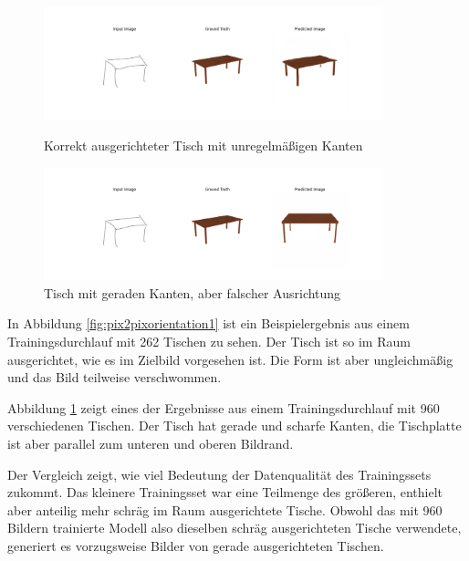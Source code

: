 \begin{figure}[h]
	\centering
	\includegraphics[width=0.875\textwidth]{bilder/pix2pix_progress/table_result_orientation1.png}
  \caption[Tisch korrekt ausgerichtet]{Korrekt ausgerichteter Tisch mit unregelmäßigen Kanten}
  \label{fig:pix2pixorientation1}

	\includegraphics[width=0.875\textwidth]{bilder/pix2pix_progress/table_result_orientation2.png}
	\caption[Tisch mit geraden Kanten]{Tisch mit geraden Kanten, aber falscher Ausrichtung}
	\label{fig:pix2pixorientation2}
\end{figure}

In Abbildung \ref{fig:pix2pixorientation1} ist ein Beispielergebnis aus einem Trainingsdurchlauf mit 262 Tischen zu sehen. Der Tisch ist so im Raum ausgerichtet, wie es im Zielbild vorgesehen ist. Die Form ist aber ungleichmäßig und das Bild teilweise verschwommen.

Abbildung \ref{fig:pix2pixorientation2} zeigt eines der Ergebnisse aus einem Trainingsdurchlauf mit 960 verschiedenen Tischen. Der Tisch hat gerade und scharfe Kanten, die Tischplatte ist aber parallel zum unteren und oberen Bildrand.

Der Vergleich zeigt, wie viel Bedeutung der Datenqualität des Trainingssets zukommt. Das kleinere Trainingsset war eine Teilmenge des größeren, enthielt aber anteilig mehr schräg im Raum ausgerichtete Tische. Obwohl das mit 960 Bildern trainierte Modell also dieselben schräg ausgerichteten Tische verwendete, generiert es vorzugsweise Bilder von gerade ausgerichteten Tischen.

